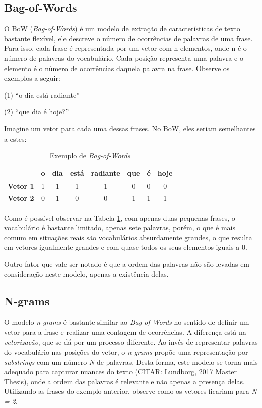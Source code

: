 \subsection{Bag-of-Words}

O BoW (\textit{Bag-of-Words}) é um modelo de extração de características de texto bastante flexível, ele descreve o número de ocorrências de palavras de uma frase. Para isso, cada frase é representada por um vetor com n elementos, onde n é o número de palavras do vocabulário. Cada posição representa uma palavra e o elemento é o número de ocorrências daquela palavra na frase. Observe os exemplos a seguir:

\begin{samepage}
(1) “o dia está radiante”

\nopagebreak

(2) “que dia é hoje?”
\end{samepage}

Imagine um vetor para cada uma dessas frases. No BoW, eles seriam semelhantes a estes:

\begin{center}
\begin{table}[htbp]
\centering
\begin{tabular}{c|ccccccc}
 & \textbf{o} & \textbf{dia} & \textbf{está} & \textbf{radiante} & \textbf{que} & \textbf{é} & \textbf{hoje} \\ \hline
\textbf{Vetor 1} & 1 & 1 & 1 & 1 & 0 & 0 & 0 \\
\textbf{Vetor 2} & 0 & 1 & 0 & 0 & 1 & 1 & 1 
\end{tabular}
\caption{Exemplo de \textit{Bag-of-Words}}
\label{bow}
\end{table}
\end{center}

Como é possível observar na Tabela \ref{bow}, com apenas duas pequenas frases, o vocabulário é bastante limitado, apenas sete palavras, porém, o que é mais comum em situações reais são vocabulários absurdamente grandes, o que resulta em vetores igualmente grandes e com quase todos os seus elementos iguais a 0.

Outro fator que vale ser notado é que a ordem das palavras não são levadas em consideração neste modelo, apenas a existência delas.

\subsection{N-grams}

O modelo \textit{n-grams} é bastante similar ao \textit{Bag-of-Words} no sentido de definir um vetor para a frase e realizar uma contagem de ocorrências. A diferença está na \textit{vetorização}, que se dá por um processo diferente. Ao invés de representar palavras do vocabulário nas posições do vetor, o \textit{n-grams} propõe uma representação por \textit{substrings}  com um número \textit{N} de palavras. Desta forma, este modelo se torna mais adequado para capturar nuances do texto (CITAR: Lundborg, 2017 Master Thesis), onde a ordem das palavras é relevante e não apenas a presença delas. Utilizando as frases do exemplo anterior, observe como os vetores ficariam para \textit{N = 2}.

